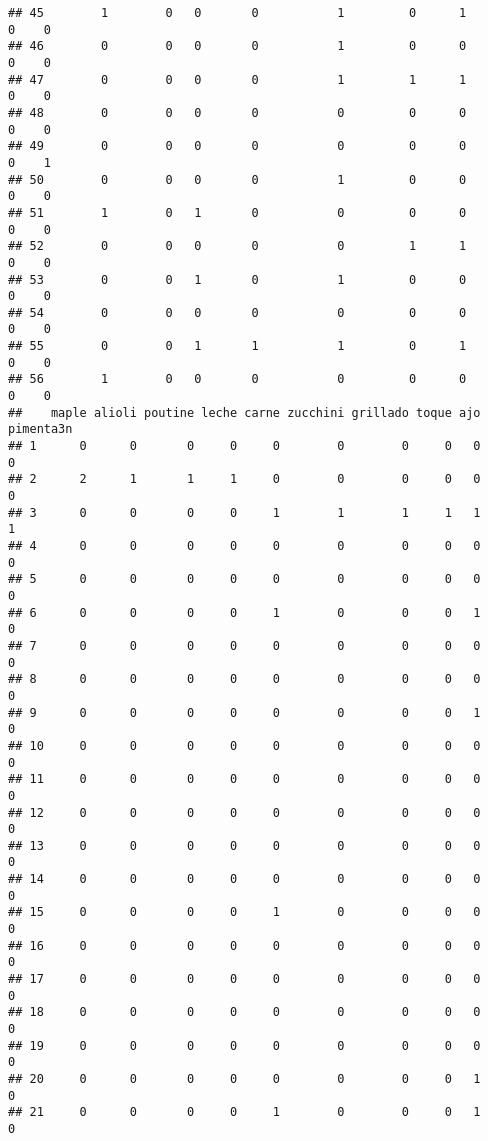 \documentclass[
]{article}
\begin{document}
\begin{verbatim}
## 45        1        0   0       0           1         0      1        0    0
## 46        0        0   0       0           1         0      0        0    0
## 47        0        0   0       0           1         1      1        0    0
## 48        0        0   0       0           0         0      0        0    0
## 49        0        0   0       0           0         0      0        0    1
## 50        0        0   0       0           1         0      0        0    0
## 51        1        0   1       0           0         0      0        0    0
## 52        0        0   0       0           0         1      1        0    0
## 53        0        0   1       0           1         0      0        0    0
## 54        0        0   0       0           0         0      0        0    0
## 55        0        0   1       1           1         0      1        0    0
## 56        1        0   0       0           0         0      0        0    0
##    maple alioli poutine leche carne zucchini grillado toque ajo pimenta3n
## 1      0      0       0     0     0        0        0     0   0         0
## 2      2      1       1     1     0        0        0     0   0         0
## 3      0      0       0     0     1        1        1     1   1         1
## 4      0      0       0     0     0        0        0     0   0         0
## 5      0      0       0     0     0        0        0     0   0         0
## 6      0      0       0     0     1        0        0     0   1         0
## 7      0      0       0     0     0        0        0     0   0         0
## 8      0      0       0     0     0        0        0     0   0         0
## 9      0      0       0     0     0        0        0     0   1         0
## 10     0      0       0     0     0        0        0     0   0         0
## 11     0      0       0     0     0        0        0     0   0         0
## 12     0      0       0     0     0        0        0     0   0         0
## 13     0      0       0     0     0        0        0     0   0         0
## 14     0      0       0     0     0        0        0     0   0         0
## 15     0      0       0     0     1        0        0     0   0         0
## 16     0      0       0     0     0        0        0     0   0         0
## 17     0      0       0     0     0        0        0     0   0         0
## 18     0      0       0     0     0        0        0     0   0         0
## 19     0      0       0     0     0        0        0     0   0         0
## 20     0      0       0     0     0        0        0     0   1         0
## 21     0      0       0     0     1        0        0     0   1         0

\end{verbatim}
\end{document}
